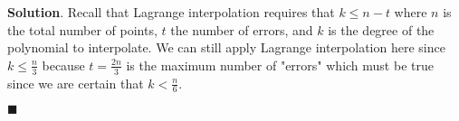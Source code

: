 \documentclass[12pt]{article}
\theoremstyle{definition}
\newenvironment{s}{%
        \begin{trivlist} \item \textbf{Solution}. }{%
            \hspace*{\fill} $\blacksquare$\end{trivlist}}%
\begin{document}
{\begin{s}
Recall that Lagrange interpolation requires that $k\leq n-t$ where $n$ is the total number of points, $t$ the number of errors, and $k$ is the degree of the polynomial to interpolate. We can still apply Lagrange interpolation here since $k \leq \frac{n}{3}$ because $t=\frac{2n}{3}$ is the maximum number of "errors" which must be true since we are certain that $k < \frac{n}{6}$.


\end{s}
\end{document}
